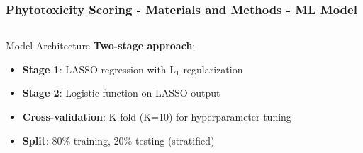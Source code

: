 \documentclass[aspectratio=43]{beamer}
\begin{document}
\begin{frame}
    \frametitle{\small Phytotoxicity Scoring - Materials and Methods - ML Model}
    
    \begin{columns}
        \begin{column}{0.5\textwidth}
            \begin{exampleblock}{Model Architecture}
                \scriptsize
                \textbf{Two-stage approach}:
                \begin{itemize}
                    \item \textbf{Stage 1}: LASSO regression with L\ensuremath{_1} regularization
                    \item \textbf{Stage 2}: Logistic function on LASSO output
                    \item \textbf{Cross-validation}: K-fold (K=10) for hyperparameter tuning
                    \item \textbf{Split}: 80\% training, 20\% testing (stratified)
                \end{itemize}
            \end{exampleblock}
        \end{column}
        

\end{columns}
\end{frame}
\end{document}
